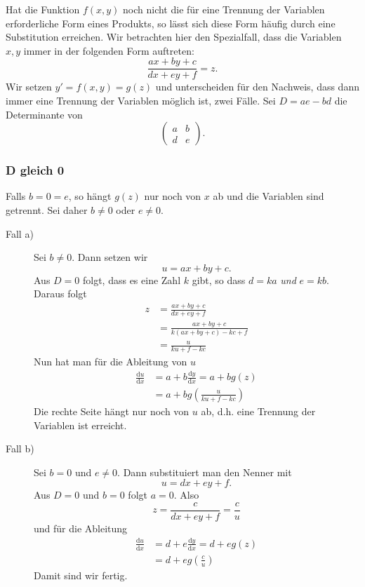 \documentclass[%
draft,
11pt,%
twoside,%
titlepage,%
german,%
headsepline%
]{scrartcl}
\begin{document}
Hat die Funktion $f(x,y)$ noch nicht die f\"ur eine Trennung der Variablen erforderliche Form eines Produkts, so l\"asst sich diese Form h\"aufig durch eine Substitution erreichen. Wir betrachten hier den Spezialfall, dass die Variablen $x,y$ immer in der folgenden Form auftreten:
$$\frac{ax+by+c}{dx+ey+f}=z.$$
Wir setzen $y'=f(x,y)=g(z)$ und unterscheiden f\"ur den Nachweis, dass dann immer eine Trennung der Variablen m\"oglich ist, zwei F\"alle. Sei $D=ae-bd$ die Determinante von
$$\begin{pmatrix}
a & b\\
d & e
\end{pmatrix}.$$

\subsubsection{D gleich 0}

Falls $b=0=e$, so h\"angt $g(z)$ nur noch von $x$ ab und die Variablen sind getrennt. Sei daher $b\neq0$ oder $e\neq0$.

\begin{description}
\item[Fall a)] Sei $b\neq0$. Dann setzen wir
$$u=ax+by+c.$$
Aus $D=0$ folgt, dass es eine Zahl $k$ gibt, so dass $d=ka$ \emph{und} $e=kb$. Daraus folgt
\begin{align*}
z &= \frac{ax+by+c}{dx+ey+f}\\
 &= \frac{ax+by+c}{k(ax+by+c)-kc+f}\\
 &= \frac{u}{ku+f-kc}
 \end{align*}
 Nun hat man f\"ur die Ableitung von $u$
\begin{align*}
\frac{\mathrm{d}u}{\mathrm{d}x}&=a+b\frac{\mathrm{d}y}{\mathrm{d}x}=a+bg(z)\\
&=a+bg\left(\frac{u}{ku+f-kc}\right)
\end{align*}
 Die rechte Seite h\"angt nur noch von $u$ ab, d.h. eine Trennung der Variablen ist erreicht.
 \item[Fall b)] Sei $b=0$ und $e\neq0$. Dann substituiert man den Nenner mit
 $$u=dx+ey+f.$$
 Aus $D=0$ und $b=0$ folgt $a=0$. Also
 $$z=\frac{c}{dx+ey+f}=\frac{c}{u}$$
 und f\"ur die Ableitung
\begin{align*}
\frac{\mathrm{d}u}{\mathrm{d}x}&=d+e\frac{\mathrm{d}y}{\mathrm{d}x}=d+eg(z)\\
&=d+eg\left(\frac{c}{u}\right)
\end{align*}
Damit sind wir fertig.
 \end{description}
 
\end{document}
